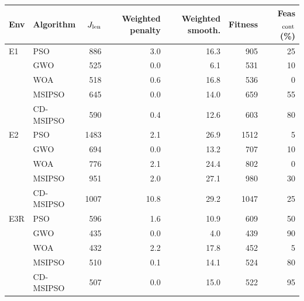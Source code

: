 \begin{tabular}{llrrrrr}
\hline
Env & Algorithm & $J_{\rm len}$ & Weighted penalty & Weighted smooth. & Fitness & Feas$_{\rm cont}$ (\%) \\
\hline
E1 & PSO & 886 & 3.0 & 16.3 & 905 & 25 \\
 & GWO & 525 & 0.0 & 6.1 & 531 & 10 \\
 & WOA & 518 & 0.6 & 16.8 & 536 & 0 \\
 & MSIPSO & 645 & 0.0 & 14.0 & 659 & 55 \\
 & CD-MSIPSO & 590 & 0.4 & 12.6 & 603 & 80 \\
\hline
E2 & PSO & 1483 & 2.1 & 26.9 & 1512 & 5 \\
 & GWO & 694 & 0.0 & 13.2 & 707 & 10 \\
 & WOA & 776 & 2.1 & 24.4 & 802 & 0 \\
 & MSIPSO & 951 & 2.0 & 27.1 & 980 & 30 \\
 & CD-MSIPSO & 1007 & 10.8 & 29.2 & 1047 & 25 \\
\hline
E3R & PSO & 596 & 1.6 & 10.9 & 609 & 50 \\
 & GWO & 435 & 0.0 & 4.0 & 439 & 90 \\
 & WOA & 432 & 2.2 & 17.8 & 452 & 5 \\
 & MSIPSO & 510 & 0.1 & 14.1 & 524 & 80 \\
 & CD-MSIPSO & 507 & 0.0 & 15.0 & 522 & 95 \\
\hline
\end{tabular}